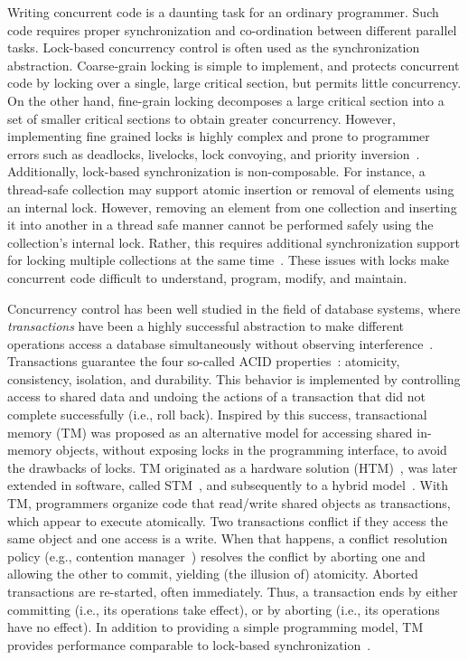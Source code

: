 \documentclass[12pt,english]{report}
\begin{document}
Writing concurrent code is a daunting task for an ordinary programmer. Such code requires proper synchronization and co-ordination between different parallel tasks. Lock-based concurrency control is often used as the synchronization abstraction. Coarse-grain locking is simple to implement, and protects concurrent code by locking over a single, large critical section, but permits little concurrency. On the other hand, fine-grain locking decomposes a large critical section into a set of smaller critical sections to obtain greater concurrency. However, implementing fine grained locks is highly complex and prone to programmer errors such as deadlocks, livelocks, lock convoying, and priority inversion~\cite{DSM84877}. Additionally, lock-based synchronization is non-composable. For instance, a thread-safe collection may support atomic insertion or removal of elements using an internal lock. However, removing an element from one collection and inserting it into another in a thread safe manner  cannot be performed safely using the collection's internal lock. Rather, this requires additional synchronization support for locking multiple collections at the same time~\cite{Weihl:1989:LAP:63264.63518}. These issues with locks make concurrent code difficult to understand, program, modify, and maintain.

Concurrency control has been well studied in the field of database systems, where \emph{transactions} have been a highly successful abstraction to make different operations access a database simultaneously without observing interference~\cite{gra88}. Transactions guarantee the four so-called ACID properties~\cite{gra88}: atomicity, consistency, isolation, and durability. This behavior is implemented by controlling access to shared data and undoing the actions of a transaction that did not complete successfully (i.e., roll back). Inspired by this success, transactional memory (TM) was proposed as an alternative model for accessing shared in-memory objects, without exposing locks in the programming interface, to avoid the drawbacks of locks. TM originated as a hardware solution (HTM)~\cite{herlihy93transactional},  was later extended in software, called STM~\cite{STMshavit95}, and subsequently to a hybrid model~\cite{damronFLLMN:HyTM:asplos:2006}. With TM, programmers organize code that read/write shared objects as transactions, which appear to execute atomically. Two transactions conflict if they access the same object and one access is a write. When that happens, a conflict resolution policy (e.g., contention manager~\cite{herlihy:stm-dynamic:podc:2003}) resolves the conflict by aborting one and allowing the other to commit, yielding (the illusion of) atomicity. Aborted transactions are re-started, often immediately. Thus, a transaction ends by either committing (i.e., its operations take effect), or by aborting (i.e., its operations have no effect). In addition to providing a simple programming model, TM provides performance comparable to lock-based synchronization~\cite{saha:mcrtstm2:popl:2006}. 
\end{document}
